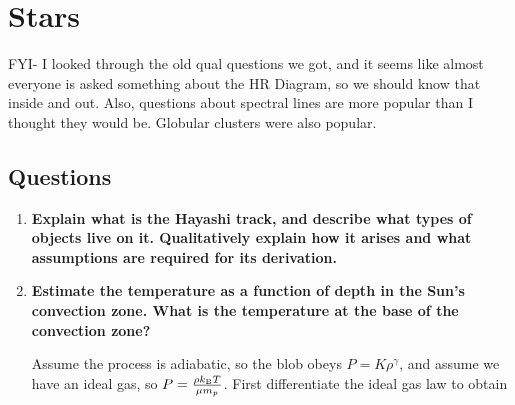 \section{Stars}

FYI- I looked through the old qual questions we got, and it seems like almost everyone is asked 
something about the HR Diagram, so we should know that inside and out.  Also, questions about 
spectral lines are more popular than I thought they would be.  Globular clusters were also popular.

\subsection{Questions}
\begin{enumerate}
\item \textbf{Explain what is the Hayashi track, and describe what types of objects live on it.
      Qualitatively explain how it arises and what assumptions are required for its derivation.}
\item \textbf{Estimate the temperature as a function of depth in the Sun's convection zone. What is the temperature at the base of the convection zone?}

	Assume the process is adiabatic, so the blob obeys $P = K \rho ^\gamma$, and assume we have an ideal gas, so $P = \frac{\rho k_{\rm B} T}{\mu m_p}$. First differentiate the ideal gas law to obtain
	

\end{enumerate}
